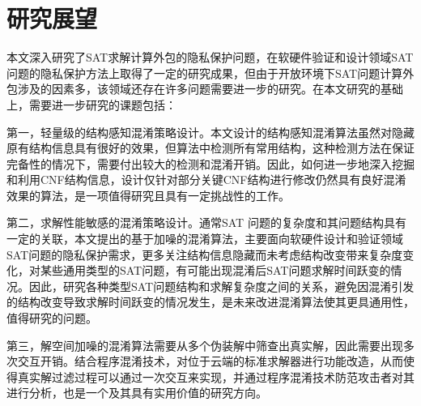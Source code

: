 \section{研究展望}
本文深入研究了SAT求解计算外包的隐私保护问题，在软硬件验证和设计领域SAT问题的隐私保护方法上取得了一定的研究成果，但由于开放环境下SAT问题计算外包涉及的因素多，该领域还存在许多问题需要进一步的研究。在本文研究的基础上，需要进一步研究的课题包括：

第一，轻量级的结构感知混淆策略设计。本文设计的结构感知混淆算法虽然对隐藏原有结构信息具有很好的效果，但算法中检测所有常用结构，这种检测方法在保证完备性的情况下，需要付出较大的检测和混淆开销。因此，如何进一步地深入挖掘和利用CNF结构信息，设计仅针对部分关键CNF结构进行修改仍然具有良好混淆效果的算法，是一项值得研究且具有一定挑战性的工作。

第二，求解性能敏感的混淆策略设计。通常SAT 问题的复杂度和其问题结构具有一定的关联，本文提出的基于加噪的混淆算法，主要面向软硬件设计和验证领域SAT问题的隐私保护需求，更多关注结构信息隐藏而未考虑结构改变带来复杂度变化，对某些通用类型的SAT问题，有可能出现混淆后SAT问题求解时间跃变的情况。因此，研究各种类型SAT问题结构和求解复杂度之间的关系，避免因混淆引发的结构改变导致求解时间跃变的情况发生，是未来改进混淆算法使其更具通用性，值得研究的问题。

第三，解空间加噪的混淆算法需要从多个伪装解中筛查出真实解，因此需要出现多次交互开销。结合程序混淆技术，对位于云端的标准求解器进行功能改造，从而使得真实解过滤过程可以通过一次交互来实现，并通过程序混淆技术防范攻击者对其进行分析，也是一个及其具有实用价值的研究方向。

